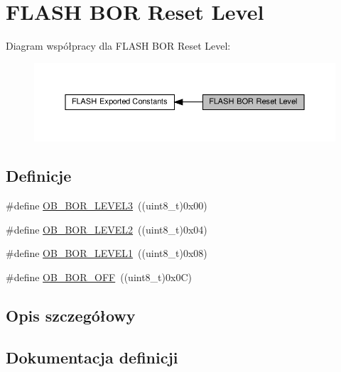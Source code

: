 \hypertarget{group___f_l_a_s_h_ex___b_o_r___reset___level}{}\section{F\+L\+A\+SH B\+OR Reset Level}
\label{group___f_l_a_s_h_ex___b_o_r___reset___level}
Diagram współpracy dla F\+L\+A\+SH B\+OR Reset Level\+:\nopagebreak
\begin{figure}[H]
\begin{center}
\leavevmode
\includegraphics[width=350pt]{group___f_l_a_s_h_ex___b_o_r___reset___level}
\end{center}
\end{figure}
\subsection*{Definicje}
\begin{DoxyCompactItemize}
\item 
\#define \hyperlink{group___f_l_a_s_h_ex___b_o_r___reset___level_ga3132b8202c0a345e9dd33d136714b046}{O\+B\+\_\+\+B\+O\+R\+\_\+\+L\+E\+V\+E\+L3}~((uint8\+\_\+t)0x00)
\item 
\#define \hyperlink{group___f_l_a_s_h_ex___b_o_r___reset___level_gad678e849fcf817f6ed2d837538e8ebc2}{O\+B\+\_\+\+B\+O\+R\+\_\+\+L\+E\+V\+E\+L2}~((uint8\+\_\+t)0x04)
\item 
\#define \hyperlink{group___f_l_a_s_h_ex___b_o_r___reset___level_ga3a888b788e75f0bc1f9add85c9ccd9d6}{O\+B\+\_\+\+B\+O\+R\+\_\+\+L\+E\+V\+E\+L1}~((uint8\+\_\+t)0x08)
\item 
\#define \hyperlink{group___f_l_a_s_h_ex___b_o_r___reset___level_gaabc231cb1d05a94fe860f67bb5a37b12}{O\+B\+\_\+\+B\+O\+R\+\_\+\+O\+FF}~((uint8\+\_\+t)0x0\+C)
\end{DoxyCompactItemize}


\subsection{Opis szczegółowy}


\subsection{Dokumentacja definicji}
\mbox{\label{group___f_l_a_s_h_ex___b_o_r___reset___level_ga3a888b788e75f0bc1f9add85c9ccd9d6}} 
